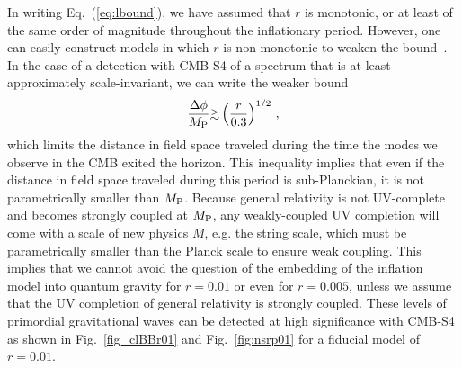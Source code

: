 In writing Eq.~(\ref{eq:lbound}), we have assumed that $r$ is monotonic, or at least of the same order of magnitude throughout the inflationary period. However, one can easily construct models in which $r$ is non-monotonic to weaken the bound~\cite{BenDayan:2009kv,Hotchkiss:2011gz, Chatterjee:2014hna}. In the case of a detection with CMB-S4 of a spectrum that is at least approximately scale-invariant, we can write the weaker bound
\begin{equation}
\frac{\Delta\phi}{M_{\rm P}}\gtrsim\left(\frac{r}{0.3}\right)^{1/2}\,,
\end{equation}
which limits the distance in field space traveled during the time the modes we observe in the CMB exited the horizon. This inequality implies that even if the distance in field space traveled during this period is sub-Planckian, it is not parametrically smaller than $M_{\rm P}$. Because general relativity is not UV-complete and becomes strongly coupled at $M_{\rm P}$, any weakly-coupled UV completion will come with a scale of new physics $M$, e.g. the string scale, which must be parametrically smaller than the Planck scale to ensure weak coupling. This implies that we cannot avoid the question of the embedding of the inflation model into quantum gravity for $r=0.01$ or even for $r=0.005$, unless we assume that the UV completion of general relativity is strongly coupled. These levels of primordial gravitational waves can be detected at high significance with CMB-S4 as shown in Fig.~\ref{fig_clBBr01} and Fig.~\ref{fig:nsrp01} for a fiducial model of $r=0.01$.

